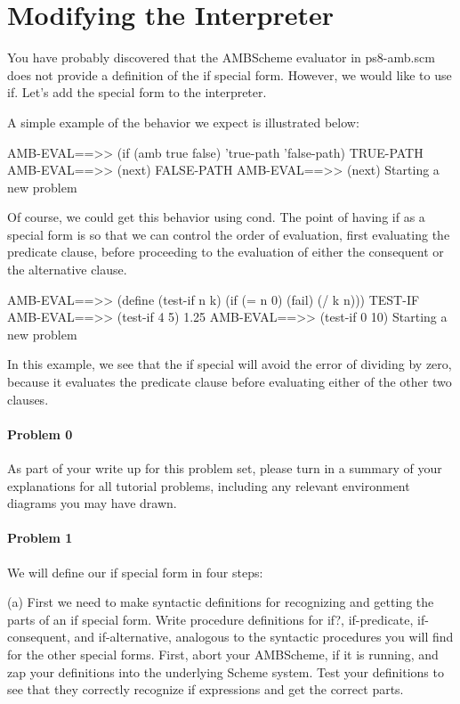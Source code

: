 \section{Modifying the Interpreter}

You have probably discovered that the {\sc AMBScheme} evaluator in {\cf
ps8-amb.scm} does not provide a definition of the {\cf if} special
form.  However, we would like to use {\cf if}.  Let's add the special
form to the interpreter.  


A simple example of the behavior we expect is illustrated below:

\beginlisp
AMB-EVAL==>> (if (amb true false)
                 'true-path
                 'false-path)
TRUE-PATH
\null
AMB-EVAL==>> (next)
FALSE-PATH
\null
AMB-EVAL==>> (next)
Starting a new problem
\endlisp

Of course, we could get this behavior using {\cf cond}.  The point of
having {\cf if} as a special form is so that we can control the order of
evaluation, first evaluating the predicate clause, before proceeding to
the evaluation of either the consequent or the alternative clause.

\beginlisp
AMB-EVAL==>> (define (test-if n k)
                (if (= n 0)
                    (fail)
                    (/ k n)))
TEST-IF
\null
AMB-EVAL==>> (test-if 4 5)
1.25
\null
AMB-EVAL==>> (test-if 0 10)
Starting a new problem
\endlisp

In this example, we see that the {\cf if} special will avoid the error
of dividing by zero, because it evaluates the predicate clause before
evaluating either of the other two clauses.

\paragraph{Problem 0}

As part of your write up for this problem set, please turn in a summary of your
explanations for all tutorial problems, including any relevant environment
diagrams you may have drawn.


\paragraph{Problem 1}

We will define our {\cf if} special form in four steps:


(a)
First we need to make syntactic definitions for recognizing and
getting the parts of an {\cf if} special form.  Write procedure
definitions for {\cf if?}, {\cf if-predicate}, {\cf 
if-consequent}, and {\cf if-alternative}, analogous to the syntactic
procedures you will find for the other special forms.  First, {\sc abort} your {\sc AMBScheme},
if it is running, and zap your definitions into the underlying {\sc Scheme}
system.  Test your definitions to see that they correctly recognize
{\cf if} expressions and get the correct parts.

